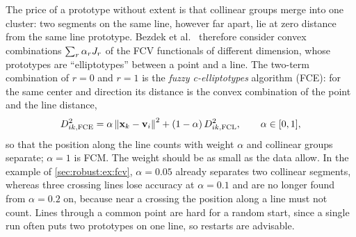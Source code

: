 The price of a prototype without extent is that collinear groups merge into one cluster: two segments on the same line, however far apart, lie at zero distance from the same line prototype. Bezdek et al.\ \cite{bezdek:1981:fcv2} therefore consider convex combinations $\sum_r\alpha_rJ_r$ of the FCV functionals of different dimension, whose prototypes are ``elliptotypes'' between a point and a line. The two-term combination of $r=0$ and $r=1$ is the \emph{fuzzy c-elliptotypes} algorithm (FCE): for the same center and direction its distance is the convex combination of the point and the line distance,
\begin{equation}
  D^2_{ik,\mathrm{FCE}}=\alpha\left\lVert \mathbf{x}_k-\mathbf{v}_i \right\rVert^2+(1-\alpha)\,D^2_{ik,\mathrm{FCL}},\qquad \alpha\in[0,1],
  \label{eq:robust:fce}
\end{equation}
so that the position along the line counts with weight $\alpha$ and collinear groups separate; $\alpha=1$ is FCM. The weight should be as small as the data allow. In the example of \cref{sec:robust:ex:fcv}, $\alpha=0.05$ already separates two collinear segments, whereas three crossing lines lose accuracy at $\alpha=0.1$ and are no longer found from $\alpha=0.2$ on, because near a crossing the position along a line must not count. Lines through a common point are hard for a random start, since a single run often puts two prototypes on one line, so restarts are advisable.

